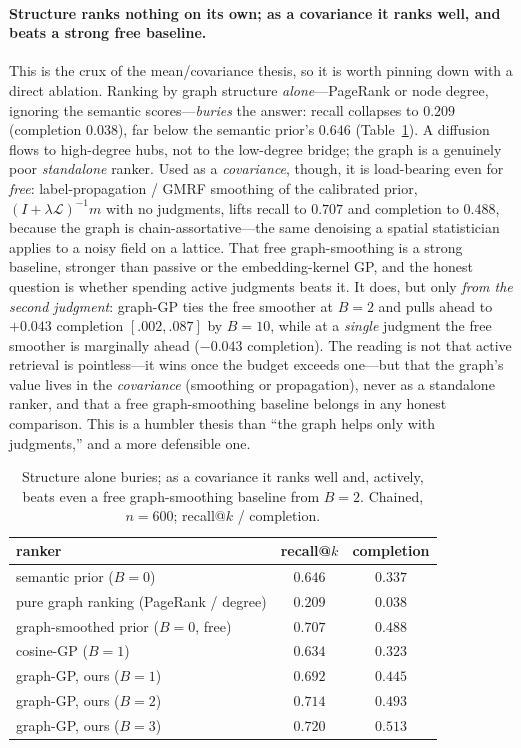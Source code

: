 \documentclass[11pt]{article}
\theoremstyle{plain}
\theoremstyle{definition}
\theoremstyle{remark}
\begin{document}
\paragraph{Structure ranks nothing on its own; as a covariance it ranks well, and beats a strong free baseline.}
This is the crux of the mean/covariance thesis, so it is worth pinning down with a direct ablation. Ranking by
graph structure \emph{alone}---PageRank or node degree, ignoring the semantic scores---\emph{buries} the answer:
recall collapses to $0.209$ (completion $0.038$), far below the semantic prior's $0.646$ (Table~\ref{tab:ablate}).
A diffusion flows to high-degree hubs, not to the low-degree bridge; the graph is a genuinely poor \emph{standalone}
ranker. Used as a \emph{covariance}, though, it is load-bearing even for \emph{free}: label-propagation / GMRF
smoothing of the calibrated prior, $(I+\lambda\mathcal L)^{-1}m$ with no judgments, lifts recall to $0.707$ and
completion to $0.488$, because the graph is chain-assortative---the same denoising a spatial statistician applies to
a noisy field on a lattice. That free graph-smoothing is a strong baseline, stronger than passive or the
embedding-kernel GP, and the honest question is whether spending active judgments beats it. It does, but only
\emph{from the second judgment}: graph-GP ties the free smoother at $B{=}2$ and pulls ahead to $+0.043$ completion
$[.002,.087]$ by $B{=}10$, while at a \emph{single} judgment the free smoother is marginally ahead ($-0.043$
completion). The reading is not that active retrieval is pointless---it wins once the budget exceeds one---but that
the graph's value lives in the \emph{covariance} (smoothing or propagation), never as a standalone ranker, and that
a free graph-smoothing baseline belongs in any honest comparison. This is a humbler thesis than ``the graph helps
only with judgments,'' and a more defensible one.
\begin{table}[h]\centering\small
\caption{Structure alone buries; as a covariance it ranks well and, actively, beats even a free graph-smoothing
baseline from $B{=}2$. Chained, $n{=}600$; recall@$k$ / completion.}\label{tab:ablate}
\begin{tabular}{lcc}
\toprule
ranker & recall@$k$ & completion \\ \midrule
semantic prior ($B{=}0$) & $0.646$ & $0.337$ \\
pure graph ranking (PageRank / degree) & $0.209$ & $0.038$ \\
graph-smoothed prior ($B{=}0$, free) & $0.707$ & $0.488$ \\
cosine-GP ($B{=}1$) & $0.634$ & $0.323$ \\
graph-GP, ours ($B{=}1$) & $0.692$ & $0.445$ \\
graph-GP, ours ($B{=}2$) & $0.714$ & $0.493$ \\
graph-GP, ours ($B{=}3$) & $0.720$ & $0.513$ \\
\bottomrule
\end{tabular}
\end{table}
\end{document}
